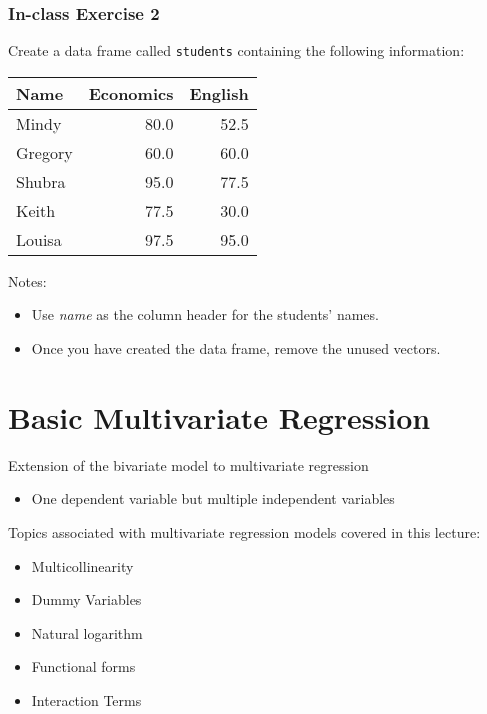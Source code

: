 \documentclass[
]{article}
\providecommand{\tightlist}{%
  \setlength{\itemsep}{0pt}\setlength{\parskip}{0pt}}
\begin{document}
\hypertarget{in-class-exercise-2}{%
\subsubsection{In-class Exercise 2}\label{in-class-exercise-2}}

Create a data frame called \texttt{students} containing the following information:

\begin{tabular}{l|r|r}
\hline
Name & Economics & English\\
\hline
Mindy & 80.0 & 52.5\\
\hline
Gregory & 60.0 & 60.0\\
\hline
Shubra & 95.0 & 77.5\\
\hline
Keith & 77.5 & 30.0\\
\hline
Louisa & 97.5 & 95.0\\
\hline
\end{tabular}

Notes:

\begin{itemize}
\tightlist
\item
  Use \emph{name} as the column header for the students' names.
\item
  Once you have created the data frame, remove the unused vectors.
\end{itemize}

\hypertarget{basic-multivariate-regression}{%
\section{Basic Multivariate Regression}\label{basic-multivariate-regression}}

Extension of the bivariate model to multivariate regression

\begin{itemize}
\tightlist
\item
  One dependent variable but multiple independent variables
\end{itemize}

Topics associated with multivariate regression models covered in this lecture:

\begin{itemize}
\tightlist
\item
  Multicollinearity
\item
  Dummy Variables
\item
  Natural logarithm
\item
  Functional forms
\item
  Interaction Terms
\end{itemize}
\end{document}
